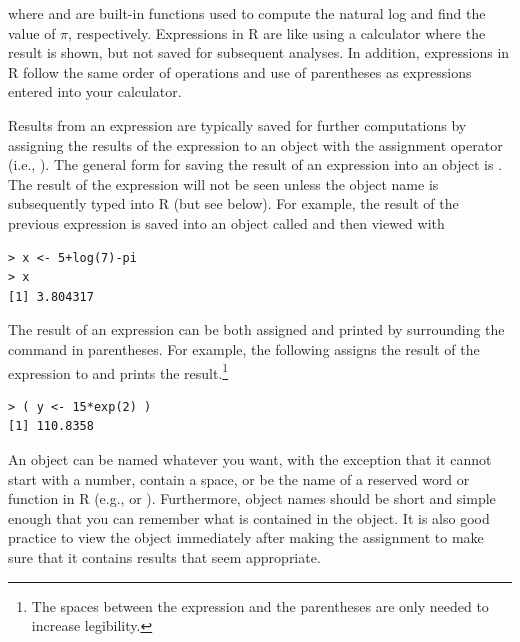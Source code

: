 \documentclass[10pt,openany]{book}\usepackage[]{graphicx}\usepackage[]{color}
\makeatletter
\newenvironment{kframe}{%
 \def\at@end@of@kframe{}%
 \ifinner\ifhmode%
  \def\at@end@of@kframe{\end{minipage}}%
  \begin{minipage}{\columnwidth}%
 \fi\fi%
 \def\FrameCommand##1{\hskip\@totalleftmargin \hskip-\fboxsep
 \colorbox{shadecolor}{##1}\hskip-\fboxsep
     \hskip-\linewidth \hskip-\@totalleftmargin \hskip\columnwidth}%
 \MakeFramed {\advance\hsize-\width
   \@totalleftmargin\z@ \linewidth\hsize
   \@setminipage}}%
 {\par\unskip\endMakeFramed%
 \at@end@of@kframe}
\newenvironment{knitrout}{}{} %
\makeatother
\begin{document}
where  and  are built-in functions used to compute the natural log and find the value of $\pi$, respectively.  Expressions in R are like using a calculator where the result is shown, but not saved for subsequent analyses.  In addition, expressions in R follow the same order of operations and use of parentheses as expressions entered into your calculator.


Results from an expression are typically saved for further computations by assigning the results of the expression to an object with the assignment operator (i.e., \R{<-}).  The general form for saving the result of an expression into an object is .  The result of the expression will not be seen unless the object name is subsequently typed into R (but see below).  For example, the result of the previous expression is saved into an object called  and then viewed with
\begin{knitrout}
\color{fgcolor}\begin{kframe}
\begin{verbatim}
> x <- 5+log(7)-pi
> x
[1] 3.804317
\end{verbatim}
\end{kframe}
\end{knitrout}
The result of an expression can be both assigned and printed by surrounding the command in parentheses.  For example, the following assigns the result of the expression to  and prints the result.\footnote{The spaces between the expression and the parentheses are only needed to increase legibility.}
\begin{knitrout}
\color{fgcolor}\begin{kframe}
\begin{verbatim}
> ( y <- 15*exp(2) )
[1] 110.8358
\end{verbatim}
\end{kframe}
\end{knitrout}


An object can be named whatever you want, with the exception that it cannot start with a number, contain a space, or be the name of a reserved word or function in R (e.g.,  or ).  Furthermore, object names should be short and simple enough that you can remember what is contained in the object.  It is also good practice to view the object immediately after making the assignment to make sure that it contains results that seem appropriate.
\end{document}
